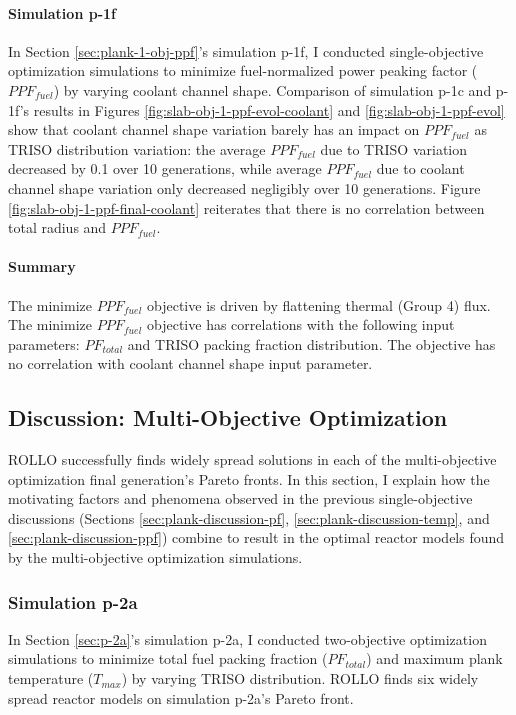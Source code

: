 \paragraph{Simulation p-1f}
In Section \ref{sec:plank-1-obj-ppf}'s simulation p-1f, I conducted single-objective 
optimization simulations to minimize fuel-normalized power peaking factor ($PPF_{fuel}$) 
by varying coolant channel shape.
Comparison of simulation p-1c and p-1f's results in Figures 
\ref{fig:slab-obj-1-ppf-evol-coolant} and \ref{fig:slab-obj-1-ppf-evol}
show that coolant channel shape variation barely has an impact on $PPF_{fuel}$ as 
\gls{TRISO} distribution variation: the average $PPF_{fuel}$ due to \gls{TRISO} 
variation decreased by 0.1 over 10 generations, while average $PPF_{fuel}$ due to 
coolant channel shape variation only decreased negligibly over 10 generations. 
Figure \ref{fig:slab-obj-1-ppf-final-coolant} reiterates that there is no correlation 
between total radius and $PPF_{fuel}$. 

\paragraph{Summary}
The minimize $PPF_{fuel}$ objective is driven by flattening thermal (Group 4) flux. 
The minimize $PPF_{fuel}$ objective has correlations with the following input parameters: 
$PF_{total}$ and TRISO packing fraction distribution. 
The objective has no correlation with coolant channel shape input parameter.

\subsection{Discussion: Multi-Objective Optimization}
\label{sec:plank-discussion-multi}
\gls{ROLLO} successfully finds widely spread solutions in each of the multi-objective 
optimization final generation's Pareto fronts.
In this section, I explain how the motivating factors and phenomena observed in 
the previous single-objective discussions (Sections 
\ref{sec:plank-discussion-pf}, \ref{sec:plank-discussion-temp}, and 
\ref{sec:plank-discussion-ppf}) combine to result in the optimal reactor models found 
by the multi-objective optimization simulations. 

\subsubsection{Simulation p-2a}
In Section \ref{sec:p-2a}'s simulation p-2a, I conducted two-objective 
optimization simulations to minimize total fuel packing fraction ($PF_{total}$) and 
maximum plank temperature ($T_{max}$) by varying TRISO distribution. 
\gls{ROLLO} finds six widely spread reactor models on simulation p-2a's Pareto 
front. 

